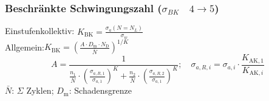         \subsubsection{Beschränkte Schwingungszahl ($\sigma_{BK}\quad4\rightarrow5$)}
            Einstufenkollektiv: $\displaystyle K_{\textrm{BK}}= \frac{\sigma_{a}(N=N_L)}{\sigma_w}$\\
            Allgemein:\qquad\qquad $\displaystyle K_{\textrm{BK}}=\left(\frac{A\cdot D_{\textrm{m}}\cdot N_{\textrm{D}}}{\bar{N}}\right)^{1/K}$
            \[A = \frac{1}{\frac{n_1}{\bar{N}}\cdot\left(\frac{\sigma_{a,R,1}}{\sigma_{a,1}}\right)^{K}+\frac{n_2}{\bar{N}}\cdot\left(\frac{\sigma_{a,R,2}}{\sigma_{a,1}}\right)^{K}};\quad \sigma_{a,R,i}=\sigma_{a,i}\cdot\frac{K_{\textrm{AK},1}}{K_{\textrm{AK},i}}\]
            $\bar{N}$: $\Sigma$ Zyklen; \qquad $D_{\textrm{m}}$: Schadensgrenze